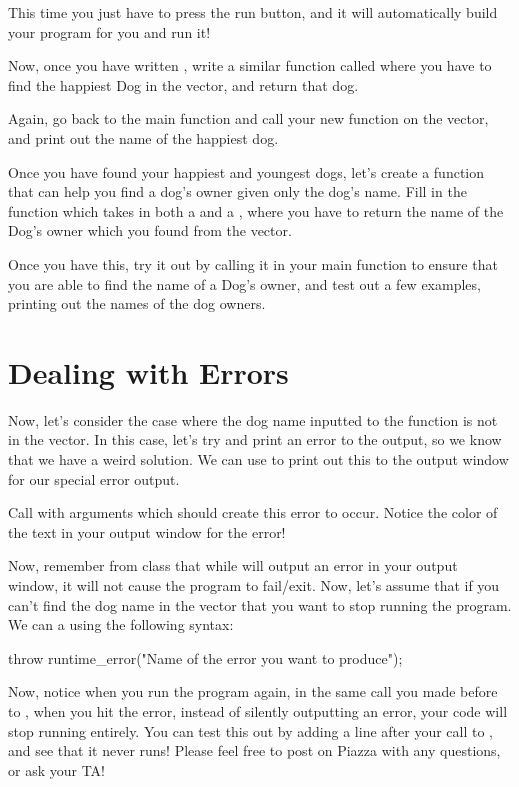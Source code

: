 \documentclass{tufte-handout}
\begin{document}
This time you just have to press the run button, and it will automatically build your program for you and run it!

Now, once you have written , write a similar function called  where you have to find the happiest Dog in the vector, and return that dog.

Again, go back to the main function and call your new function on the  vector, and print out the name of the happiest dog.

Once you have found your happiest and youngest dogs, let's create a function that can help you find a dog's owner given only the dog's name.  Fill in the function  which takes in both a  and a , where you have to return the name of the Dog's owner which you found from the vector.

Once you have this, try it out by calling it in your main function to ensure that you are able to find the name of a Dog's owner, and test out a few examples, printing out the names of the dog owners.

\section{Dealing with Errors}

Now, let's consider the case where the dog name inputted to the  function is not in the  vector.  In this case, let's try and print an error to the output, so we know that we have a weird solution.  We can use  to print out this to the output window for our special error output.  

Call  with arguments which should create this error to occur.  
Notice the color of the text in your output window for the error!  

Now, remember from class that while  will output an error in your output window, it will not cause the program to fail/exit.  
Now, let's assume that if you can't find the dog name in the  vector that you want to stop running the program.  
We can  a  using the following syntax: 
\begin{Code}
throw runtime_error("Name of the error you want to produce");
\end{Code}

Now, notice when you run the program again, in the same call you made before to , when you hit the error, instead of silently outputting an error, your code will stop running entirely.  
You can test this out by adding a  line after your call to , and see that it never runs! 
Please feel free to post on Piazza with any questions, or ask your TA!  
\end{document}
